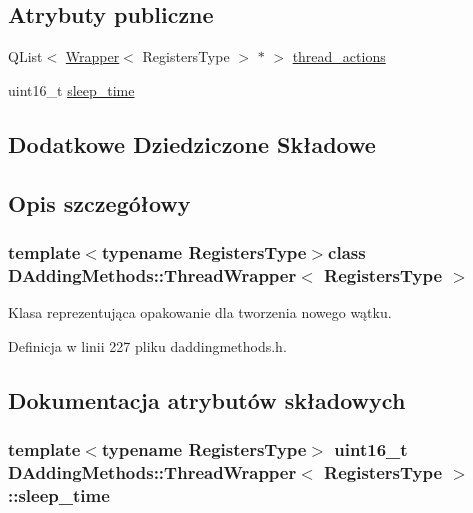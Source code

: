 \subsection*{Atrybuty publiczne}
\begin{DoxyCompactItemize}
\item 
Q\-List$<$ \hyperlink{class_d_adding_methods_1_1_wrapper}{Wrapper}$<$ Registers\-Type $>$ $\ast$ $>$ \hyperlink{class_d_adding_methods_1_1_thread_wrapper_a17fc0920f489293031ab914cb8d36ba7}{thread\-\_\-actions}
\item 
uint16\-\_\-t \hyperlink{class_d_adding_methods_1_1_thread_wrapper_a6125379d0d3674ddab3848951ed9ba16}{sleep\-\_\-time}
\end{DoxyCompactItemize}
\subsection*{Dodatkowe Dziedziczone Składowe}


\subsection{Opis szczegółowy}
\subsubsection*{template$<$typename Registers\-Type$>$class D\-Adding\-Methods\-::\-Thread\-Wrapper$<$ Registers\-Type $>$}

Klasa reprezentująca opakowanie dla tworzenia nowego wątku. 

Definicja w linii 227 pliku daddingmethods.\-h.



\subsection{Dokumentacja atrybutów składowych}
\hypertarget{class_d_adding_methods_1_1_thread_wrapper_a6125379d0d3674ddab3848951ed9ba16}{
\subsubsection[{sleep\-\_\-time}]{\setlength{\rightskip}{0pt plus 5cm}template$<$typename Registers\-Type$>$ uint16\-\_\-t {\bf D\-Adding\-Methods\-::\-Thread\-Wrapper}$<$ Registers\-Type $>$\-::sleep\-\_\-time}}\label{class_d_adding_methods_1_1_thread_wrapper_a6125379d0d3674ddab3848951ed9ba16}


